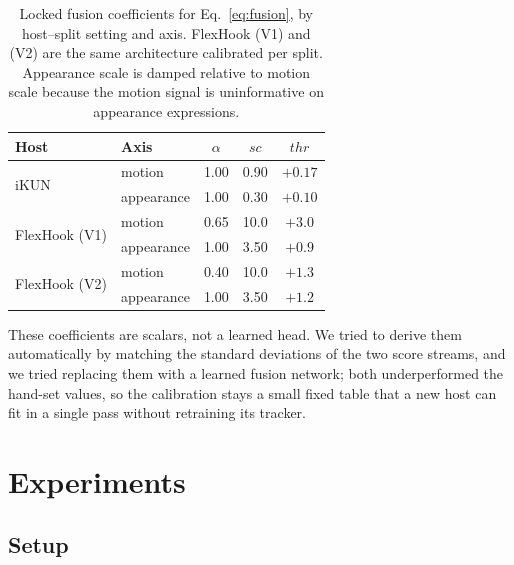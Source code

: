\documentclass[sigconf,review,anonymous]{acmart}
\begin{document}
\begin{table}[t]
\centering
\caption{Locked fusion coefficients for Eq.~\ref{eq:fusion}, by host--split setting and axis. FlexHook (V1) and (V2) are the same architecture calibrated per split. Appearance scale is damped relative to motion scale because the motion signal is uninformative on appearance expressions.}
\label{tab:recipe}
\small
\begin{tabular}{llccc}
\toprule
Host & Axis & $\alpha$ & $\mathit{sc}$ & $\mathit{thr}$ \\
\midrule
\multirow{2}{*}{iKUN}        & motion     & 1.00 & 0.90 & $+0.17$ \\
                             & appearance & 1.00 & 0.30 & $+0.10$ \\
\midrule
\multirow{2}{*}{FlexHook (V1)} & motion     & 0.65 & 10.0 & $+3.0$  \\
                             & appearance & 1.00 & 3.50 & $+0.9$  \\
\midrule
\multirow{2}{*}{FlexHook (V2)} & motion     & 0.40 & 10.0 & $+1.3$  \\
                             & appearance & 1.00 & 3.50 & $+1.2$  \\
\bottomrule
\end{tabular}
\end{table}

These coefficients are scalars, not a learned head. We tried to derive them automatically by matching the standard deviations of the two score streams, and we tried replacing them with a learned fusion network; both underperformed the hand-set values, so the calibration stays a small fixed table that a new host can fit in a single pass without retraining its tracker.

\section{Experiments}
\label{sec:exp}

\subsection{Setup}
\label{sec:setup}
\end{document}
